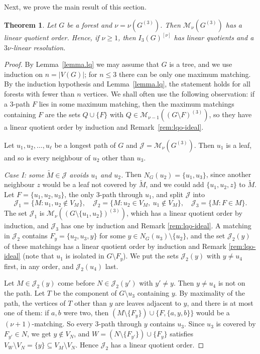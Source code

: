 \documentclass{amsart}
\newtheorem{Theorem}{Theorem}[section]
\theoremstyle{definition}
\theoremstyle{remark}
\begin{document}
Next, we prove the main result of this section.
\begin{Theorem}\label{thm:3path}
Let $G$ be a forest and $\nu=\nu(G^{(3)})$. Then $\mathcal M_\nu(G^{(3)})$ has a linear quotient order. Hence, if $\nu\geq 1$, then $I_3(G)^{[\nu]}$ has linear quotients and a $3\nu$-linear resolution.
\end{Theorem}

\begin{proof}
By Lemma~\ref{lemma.lq} we may assume that $G$ is a tree, and we use induction on $n=|V(G)|$; for $n\leq 3$ there can be only one maximum matching. By the induction hypothesis and Lemma~\ref{lemma.lq}, the statement holds for all forests with fewer than $n$ vertices. We shall often use the following observation: if a $3$-path $F$ lies in some maximum matching, then the maximum matchings containing $F$ are the sets $Q\cup\{F\}$ with $Q\in\mathcal M_{\nu-1}((G\setminus F)^{(3)})$, so they have a linear quotient order by induction and Remark~\ref{rem:lqo-ideal}.

Let $u_1,u_2,\ldots,u_\ell$ be a longest path of $G$ and $\mathcal J=\mathcal M_\nu(G^{(3)})$. Then $u_1$ is a leaf, and so is every neighbour of $u_2$ other than $u_3$.

\emph{Case I: some $\widetilde M\in\mathcal J$ avoids $u_1$ and $u_2$.} Then $N_G(u_2)=\{u_1,u_3\}$, since another neighbour $z$ would be a leaf not covered by $\widetilde M$, and we could add $\{u_1,u_2,z\}$ to $\widetilde M$. Let $F=\{u_1,u_2,u_3\}$, the only $3$-path through $u_1$, and split $\mathcal J$ into
\[
\mathcal J_1=\{M:u_1,u_2\notin V_M\},\quad\mathcal J_2=\{M:u_2\in V_M,\ u_1\notin V_M\},\quad\mathcal J_3=\{M:F\in M\}.
\]
The set $\mathcal J_1$ is $\mathcal M_\nu((G\setminus\{u_1,u_2\})^{(3)})$, which has a linear quotient order by induction, and $\mathcal J_3$ has one by induction and Remark \ref{rem:lqo-ideal}. A matching in $\mathcal J_2$ contains $F_y=\{u_2,u_3,y\}$ for some $y\in N_G(u_3)\setminus\{u_2\}$, and the set $\mathcal J_2(y)$ of these matchings has a linear quotient order by induction and Remark \ref{rem:lqo-ideal} (note that $u_1$ is isolated in $G\setminus F_y$). We put the sets $\mathcal J_2(y)$ with $y\neq u_4$ first, in any order, and $\mathcal J_2(u_4)$ last.

Let $M\in\mathcal J_2(y)$ come before $N\in\mathcal J_2(y')$ with $y'\neq y$. Then $y\neq u_4$ is not on the path. Let $T$ be the component of $G\setminus u_3$ containing $y$. By maximality of the path, the vertices of $T$ other than $y$ are leaves adjacent to $y$, and there is at most one of them: if $a,b$ were two, then $(M\setminus\{F_y\})\cup\{F,\{a,y,b\}\}$ would be a $(\nu+1)$-matching. So every $3$-path through $y$ contains $u_3$. Since $u_3$ is covered by $F_{y'}\in N$, we get $y\notin V_N$, and $W=(N\setminus\{F_{y'}\})\cup\{F_y\}$ satisfies $V_W\setminus V_N=\{y\}\subseteq V_M\setminus V_N$. Hence $\mathcal J_2$ has a linear quotient order.


\end{proof}
\end{document}
